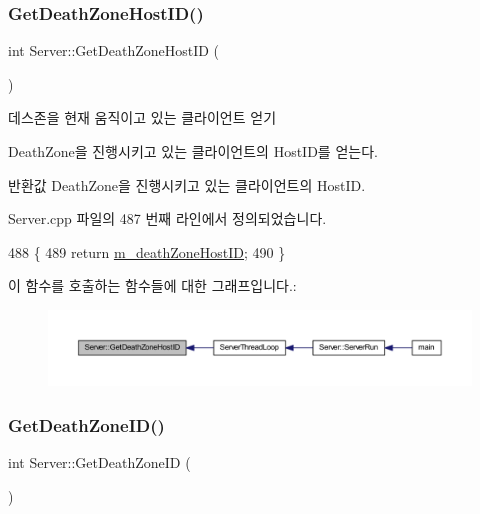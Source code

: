 \subsubsection{\texorpdfstring{Get\+Death\+Zone\+Host\+I\+D()}{GetDeathZoneHostID()}}
{\footnotesize\ttfamily int Server\+::\+Get\+Death\+Zone\+Host\+ID (\begin{DoxyParamCaption}{ }\end{DoxyParamCaption})}



데스존을 현재 움직이고 있는 클라이언트 얻기 

Death\+Zone을 진행시키고 있는 클라이언트의 Host\+I\+D를 얻는다.

\begin{DoxyReturn}{반환값}
Death\+Zone을 진행시키고 있는 클라이언트의 Host\+ID. 
\end{DoxyReturn}


Server.\+cpp 파일의 487 번째 라인에서 정의되었습니다.


\begin{DoxyCode}
488 \{
489     \textcolor{keywordflow}{return} \hyperlink{class_server_af34b71075ab32b4b7a4da757c87ded13}{m\_deathZoneHostID};
490 \}
\end{DoxyCode}
이 함수를 호출하는 함수들에 대한 그래프입니다.\+:\nopagebreak
\begin{figure}[H]
\begin{center}
\leavevmode
\includegraphics[width=350pt]{class_server_a2e2dda4eb32e6f0a43ca8aba93d4d9a9_icgraph}
\end{center}
\end{figure}
\mbox{\label{class_server_ad0f632640a71c4d229e17e7b9eb2257d}} 
\subsubsection{\texorpdfstring{Get\+Death\+Zone\+I\+D()}{GetDeathZoneID()}}
{\footnotesize\ttfamily int Server\+::\+Get\+Death\+Zone\+ID (\begin{DoxyParamCaption}{ }\end{DoxyParamCaption})}



